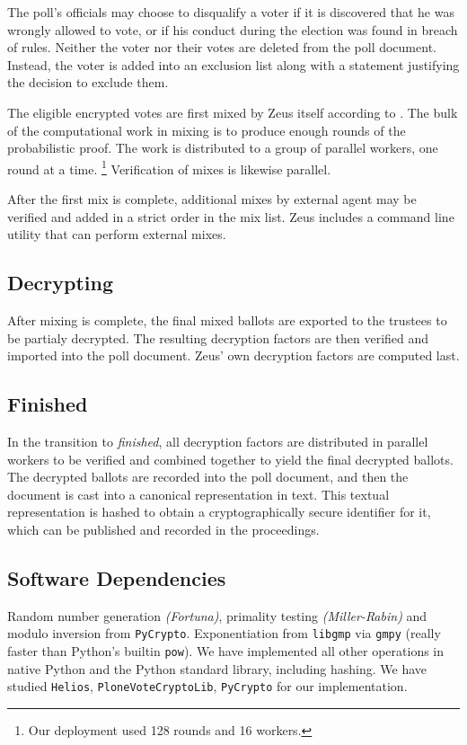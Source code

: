\documentclass[letterpaper,twocolumn,10pt]{article}
\begin{document}
The poll's officials may choose to disqualify a voter if
it is discovered that he was wrongly allowed to vote, or if
his conduct during the election was found in breach of rules.
Neither the voter nor their votes are deleted from the poll document.
Instead, the voter is added into an exclusion list along with
a statement justifying the decision to exclude them.

The eligible encrypted votes are first mixed by Zeus itself
according to \cite{Sako-Kilian}.
The bulk of the computational work in mixing is to produce
enough rounds of the probabilistic proof.
The work is distributed to a group of parallel workers,
one round at a time.
\footnote{Our deployment used 128 rounds and 16 workers.}
Verification of mixes is likewise parallel.

After the first mix is complete, additional mixes by external agent
may be verified and added in a strict order in the mix list.
Zeus includes a command line utility that can perform external mixes.

\subsection{Decrypting}
\label{decrypting}

After mixing is complete, the final mixed ballots are exported to
the trustees to be partialy decrypted.
The resulting decryption factors are then verified and imported
into the poll document.
Zeus' own decryption factors are computed last.

\subsection{Finished}
\label{finished}
In the transition to \emph{finished}, all decryption factors are
distributed in parallel workers to be verified and combined together
to yield the final decrypted ballots.
The decrypted ballots are recorded into the poll document,
and then the document is cast into a canonical representation in text.
This textual representation is hashed to obtain a cryptographically
secure identifier for it, which can be published and recorded
in the proceedings.


\subsection{Software Dependencies}
Random number generation \emph{(Fortuna)}, primality testing
\emph{(Miller-Rabin)} and modulo inversion from \texttt{PyCrypto}.
Exponentiation from \texttt{libgmp} via \texttt{gmpy} (really faster
than Python's builtin \texttt{pow}). We have implemented all other
operations in native Python and the Python standard library, including
hashing. We have studied \texttt{Helios}, \texttt{PloneVoteCryptoLib},
\texttt{PyCrypto} for our implementation.
\end{document}
